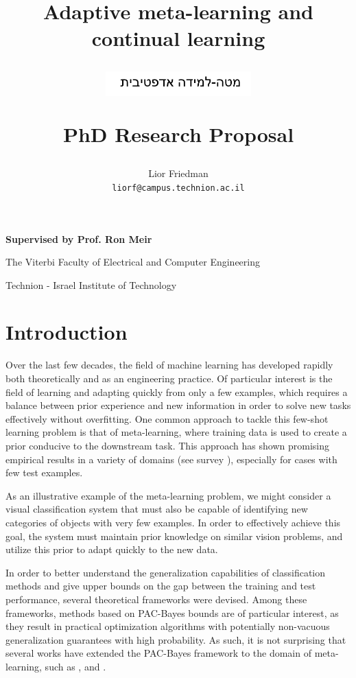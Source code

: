 \documentclass{article}
\title{Adaptive meta-learning and continual learning \\	
	\begin{figure}[h!]
		\centering
		\includegraphics[width=0.5\textwidth]{hebrew_text.PNG}
	\end{figure}
	\large	PhD Research Proposal
	}
\author{%
	Lior Friedman\\
	\texttt{liorf@campus.technion.ac.il} \\
}
\theoremstyle{definition}
\begin{document}
	
\maketitle
\thispagestyle{empty}

\vfill
\textbf{Supervised by Prof. Ron Meir}

The Viterbi Faculty of Electrical and Computer Engineering

Technion - Israel Institute of Technology


\clearpage
\tableofcontents	
\clearpage

\section{Introduction}

Over the last few decades, the field of machine learning has developed rapidly both theoretically and as an engineering practice. Of particular interest is the field of learning and adapting quickly from only a few examples, which requires a balance between prior experience and new information in order to solve new tasks effectively without overfitting.
One common approach to tackle this few-shot learning problem is that of meta-learning, where training data is used to create a prior conducive to the downstream task. This approach has shown promising empirical results in a variety of domains (see survey \citep{Hospedales2021}), especially for cases with few test examples.

As an illustrative example of the meta-learning problem, we might consider a visual classification system that must also be capable of identifying new categories of objects with very few examples. In order to effectively achieve this goal, the system must maintain prior knowledge on similar vision problems, and utilize this prior to adapt quickly to the new data.

In order to better understand the generalization capabilities of classification methods and give upper bounds on the gap between the training and test performance, several theoretical frameworks were devised.  Among these frameworks, methods based on PAC-Bayes bounds \citep{Mcallester} are of particular interest, as they result in practical optimization algorithms with potentially non-vacuous generalization guarantees with high probability. As such, it is not surprising that several works have extended the PAC-Bayes framework to the domain of meta-learning, such as \citet{Pentina2014}, \citet{Amit2018} and \citet{Rothfuss2020}.
\end{document}
